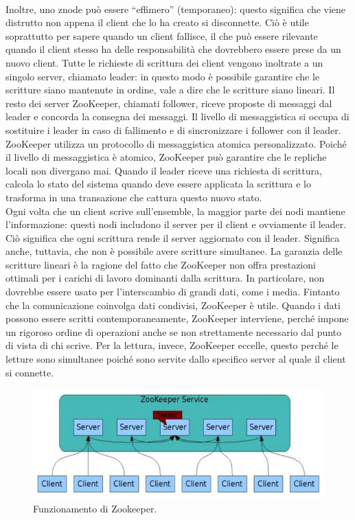 \\Inoltre, uno znode può essere “effimero” (temporaneo): questo significa che viene distrutto non appena il client che lo ha creato si disconnette. Ciò è utile soprattutto per sapere quando un client fallisce, il che può essere rilevante quando il client stesso ha delle responsabilità che dovrebbero essere prese da un nuovo client. Tutte le richieste di scrittura dei client vengono inoltrate a un singolo server, chiamato leader: in questo modo è possibile garantire che le scritture siano mantenute in ordine, vale a dire che le scritture siano lineari. Il resto dei server ZooKeeper, chiamati follower, riceve proposte di messaggi dal leader e concorda la consegna dei messaggi. Il livello di messaggistica si occupa di sostituire i leader in caso di fallimento e di sincronizzare i follower con il leader. ZooKeeper utilizza un protocollo di messaggistica atomica personalizzato. Poiché il livello di messaggistica è atomico, ZooKeeper può garantire che le repliche locali non divergano mai. Quando il leader riceve una richiesta di scrittura, calcola lo stato del sistema quando deve essere applicata la scrittura e lo trasforma in una transazione che cattura questo nuovo stato.
\\Ogni volta che un client scrive sull'ensemble, la maggior parte dei nodi mantiene l'informazione: questi nodi includono il server per il client e ovviamente il leader. Ciò significa che ogni scrittura rende il server aggiornato con il leader. Significa anche, tuttavia, che non è possibile avere scritture simultanee. La garanzia delle scritture lineari è la ragione del fatto che ZooKeeper non offra prestazioni ottimali per i carichi di lavoro dominanti dalla scrittura. In particolare, non dovrebbe essere usato per l'interscambio di grandi dati, come i media. Fintanto che la comunicazione coinvolga dati condivisi, ZooKeeper è utile. Quando i dati possono essere scritti contemporaneamente, ZooKeeper interviene, perché impone un rigoroso ordine di operazioni anche se non strettamente necessario dal punto di vista di chi scrive. Per la lettura, invece, ZooKeeper eccelle, questo perché le letture sono simultanee poiché sono servite dallo specifico server al quale il client si connette.
\begin{figure}[H]
\centering
\includegraphics[width=\textwidth]{./images/zookeeper.png}
\caption{Funzionamento di Zookeeper.}
\label{fig:zookeeper}
\end{figure}
